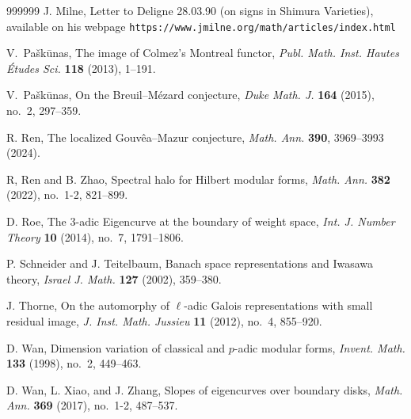 \documentclass[12pt]{amsart}
\theoremstyle{definition}
\numberwithin{equation}{subsection}
\begin{document}
\begin{thebibliography}{999999}
J. Milne, 
Letter to Deligne 28.03.90 (on signs in Shimura Varieties), available on his webpage
\texttt{https://www.jmilne.org/math/articles/index.html}




V.~Pa\v sk\=unas,
The image of Colmez's Montreal functor, {\it Publ. Math. Inst. Hautes
	\'Etudes Sci.} {\bf 118} (2013), 1--191.


V.~Pa\v sk\=unas, On the Breuil--M\'ezard conjecture, {\it Duke Math. J.} {\bf 164} (2015), no.~2, 297--359.





R. Ren,
The localized Gouv\^ea--Mazur conjecture, {\it Math. Ann.} {\bf 390}, 3969--3993 (2024).


R, Ren and B. Zhao,  Spectral halo for Hilbert modular forms, {\it Math. Ann.} {\bf 382} (2022), no.~1-2,  821--899. 


D. Roe, The $3$-adic Eigencurve at the boundary of weight space, {\it Int. J. Number Theory} {\bf10} (2014), no.~7, 1791--1806.

P. Schneider and J. Teitelbaum,
Banach space representations and Iwasawa theory, {\it Israel J. Math.} {\bf 127} (2002), 359--380.

J. Thorne, On the automorphy of $\ell$-adic Galois representations with small residual image, {\it J. Inst. Math. Jussieu} {\bf 11} (2012), no.~4, 855--920.

D. Wan, Dimension variation of classical and $p$-adic modular forms, {\it Invent.
	Math.} {\bf 133} (1998), no.~2, 449--463.

D. Wan, L. Xiao, and J. Zhang, 
Slopes of eigencurves over boundary disks, {\it Math. Ann.} {\bf 369} (2017), no.~1-2, 487--537.
\end{thebibliography}
\end{document}
